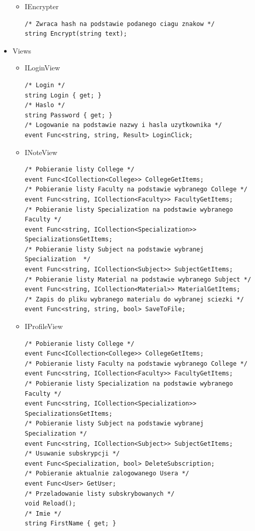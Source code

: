 \documentclass[12pt,a4paper]{article}
\begin{document}
\begin{itemize}
\begin{itemize}
\begin{lstlisting}
\end{lstlisting}
					\item IEncrypter	
\begin{lstlisting}
/* Zwraca hash na podstawie podanego ciagu znakow */
string Encrypt(string text);
\end{lstlisting}	
				\end{itemize}
\clearpage		\item Views
				\begin{itemize}
					\item ILoginView
					\begin{lstlisting}
/* Login */
string Login { get; }
/* Haslo */
string Password { get; }
/* Logowanie na podstawie nazwy i hasla uzytkownika */
event Func<string, string, Result> LoginClick;
					\end{lstlisting}
					\item INoteView					
					\begin{lstlisting}
/* Pobieranie listy College */					
event Func<ICollection<College>> CollegeGetItems;
/* Pobieranie listy Faculty na podstawie wybranego College */
event Func<string, ICollection<Faculty>> FacultyGetItems;
/* Pobieranie listy Specialization na podstawie wybranego Faculty */
event Func<string, ICollection<Specialization>> SpecializationsGetItems;
/* Pobieranie listy Subject na podstawie wybranej Specialization  */
event Func<string, ICollection<Subject>> SubjectGetItems;
/* Pobieranie listy Material na podstawie wybranego Subject */
event Func<string, ICollection<Material>> MaterialGetItems;
/* Zapis do pliku wybranego materialu do wybranej sciezki */
event Func<string, string, bool> SaveToFile;
					\end{lstlisting}
					\item IProfileView 
					\begin{lstlisting}
/* Pobieranie listy College */					
event Func<ICollection<College>> CollegeGetItems;
/* Pobieranie listy Faculty na podstawie wybranego College */
event Func<string, ICollection<Faculty>> FacultyGetItems;
/* Pobieranie listy Specialization na podstawie wybranego Faculty */
event Func<string, ICollection<Specialization>> SpecializationsGetItems;
/* Pobieranie listy Subject na podstawie wybranej Specialization */
event Func<string, ICollection<Subject>> SubjectGetItems;
/* Usuwanie subskrypcji */
event Func<Specialization, bool> DeleteSubscription;
/* Pobieranie aktualnie zalogowanego Usera */
event Func<User> GetUser;
/* Przeladowanie listy subskrybowanych */
void Reload();
/* Imie */
string FirstName { get; }

\end{lstlisting}
\end{itemize}
\end{itemize}
\end{document}
